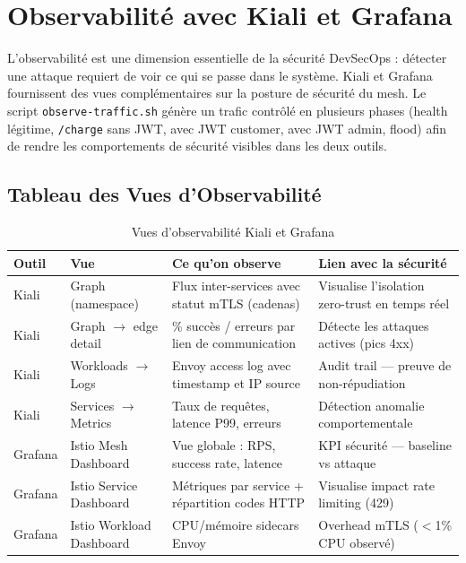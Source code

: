 \section{Observabilité avec Kiali et Grafana}

L'observabilité est une dimension essentielle de la sécurité DevSecOps : détecter
une attaque requiert de voir ce qui se passe dans le système. Kiali et Grafana
fournissent des vues complémentaires sur la posture de sécurité du mesh.
Le script \texttt{observe-traffic.sh} génère un trafic contrôlé en plusieurs
phases (health légitime, \texttt{/charge} sans JWT, avec JWT customer, avec JWT
admin, flood) afin de rendre les comportements de sécurité visibles dans les
deux outils.

\subsection{Tableau des Vues d'Observabilité}

\begin{table}[H]
  \centering
  \caption{Vues d'observabilité Kiali et Grafana}
  \label{tab:observabilite}
  \renewcommand{\arraystretch}{1.4}
  \begin{tabularx}{\textwidth}{
    C{1.5cm} L{3.2cm} L{3.5cm} X
  }
    \toprule
    Outil & Vue & Ce qu'on observe & Lien avec la sécurité \\
    \midrule
    Kiali & Graph (namespace)
      & Flux inter-services avec statut mTLS (cadenas)
      & Visualise l'isolation zero-trust en temps réel \\
    Kiali & Graph $\rightarrow$ edge detail
      & \% succès / erreurs par lien de communication
      & Détecte les attaques actives (pics 4xx) \\
    Kiali & Workloads $\rightarrow$ Logs
      & Envoy access log avec timestamp et IP source
      & Audit trail --- preuve de non-répudiation \\
    Kiali & Services $\rightarrow$ Metrics
      & Taux de requêtes, latence P99, erreurs
      & Détection anomalie comportementale \\
    Grafana & Istio Mesh Dashboard
      & Vue globale : RPS, success rate, latence
      & KPI sécurité --- baseline vs attaque \\
    Grafana & Istio Service Dashboard
      & Métriques par service + répartition codes HTTP
      & Visualise impact rate limiting (429) \\
    Grafana & Istio Workload Dashboard
      & CPU/mémoire sidecars Envoy
      & Overhead mTLS ($<$1\% CPU observé) \\
    \bottomrule
  \end{tabularx}
\end{table}

